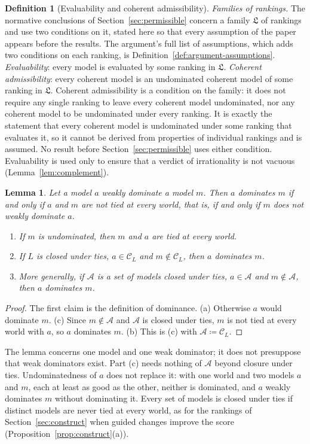 \documentclass[11pt]{article}
\newtheorem{lemma}[theorem]{Lemma}
\theoremstyle{definition}
\newtheorem{definition}[theorem]{Definition}
\theoremstyle{remark}
\newcommand{\C}{\mathcal C}
\newcommand{\Lf}{\mathfrak L}
\begin{document}
\begin{definition}[Evaluability and coherent admissibility]\label{def:family-assumptions}
\emph{Families of rankings.} The normative conclusions of Section~\ref{sec:permissible} concern a family $\Lf$ of rankings and use two conditions on it, stated here so that every assumption of the paper appears before the results. The argument's full list of assumptions, which adds two conditions on each ranking, is Definition~\ref{def:argument-assumptions}. \emph{Evaluability}: every model is evaluated by some ranking in $\Lf$. \emph{Coherent admissibility}: every coherent model is an undominated coherent model of some ranking in $\Lf$. Coherent admissibility is a condition on the family: it does not require any single ranking to leave every coherent model undominated, nor any coherent model to be undominated under every ranking. It is exactly the statement that every coherent model is undominated under some ranking that evaluates it, so it cannot be derived from properties of individual rankings and is assumed. No result before Section~\ref{sec:permissible} uses either condition. Evaluability is used only to ensure that a verdict of irrationality is not vacuous (Lemma~\ref{lem:complement}).
\end{definition}

\begin{lemma}\label{lem:ties}
Let a model $a$ weakly dominate a model $m$. Then $a$ dominates $m$ if and only if $a$ and $m$ are not tied at every world, that is, if and only if $m$ does not weakly dominate $a$.
\begin{enumerate}[label=(\alph*)]
\item If $m$ is undominated, then $m$ and $a$ are tied at every world.
\item If $L$ is closed under ties, $a\in\C_L$ and $m\notin\C_L$, then $a$ dominates $m$.
\item More generally, if $\mathcal A$ is a set of models closed under ties, $a\in\mathcal A$ and $m\notin\mathcal A$, then $a$ dominates $m$.
\end{enumerate}
\end{lemma}
\begin{proof}
The first claim is the definition of dominance. (a) Otherwise $a$ would dominate $m$. (c) Since $m\notin\mathcal A$ and $\mathcal A$ is closed under ties, $m$ is not tied at every world with $a$, so $a$ dominates $m$. (b) This is (c) with $\mathcal A\coloneqq\C_L$.
\end{proof}
The lemma concerns one model and one weak dominator; it does not presuppose that weak dominators exist. Part (c) needs nothing of $\mathcal A$ beyond closure under ties. Undominatedness of $a$ does not replace it: with one world and two models $a$ and $m$, each at least as good as the other, neither is dominated, and $a$ weakly dominates $m$ without dominating it. Every set of models is closed under ties if distinct models are never tied at every world, as for the rankings of Section~\ref{sec:construct} when guided changes improve the score (Proposition~\ref{prop:construct}(a)).
\end{document}
